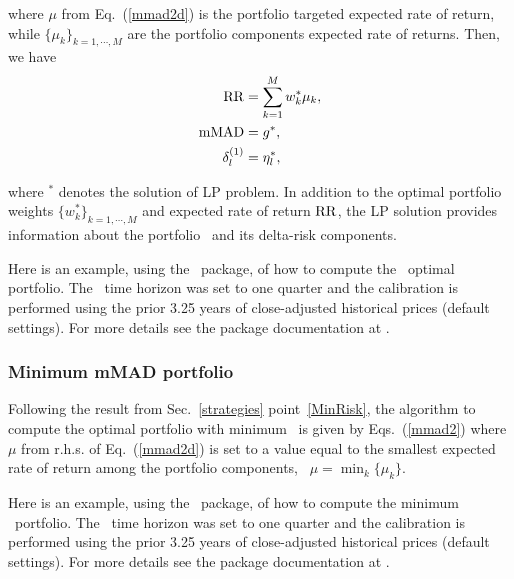 \noindent where $\mu$ from Eq.~(\ref{mmad2d}) is the portfolio targeted expected rate of return, while $\{\mu_k\}_{k = 1,\cdots,M}$
are the portfolio components expected rate of returns.
Then, we have
\begin{subequations}\label{mmad3}
\begin{align}
    \RR &= \sum_{k=1}^M w_k^* \mu_k, \label{mmad3a} \\
    \mMAD &= g^*, \label{mmad3b} \\
    \delta^{(1)}_l &= \eta_l^*, \label{mmad3c}
\end{align}
\end{subequations}

\noindent where $^*$ denotes the solution of LP problem.
In addition to the optimal portfolio weights $\{w_k^*\}_{k=1,\cdots,M}$ and
expected rate of return ${\rm RR}$, the
LP solution provides information about the portfolio \mMAD\ and its delta-risk components.

\bigskip
\noindent Here is an example, using the \azapy\ package, of how to compute the \mMAD\ optimal portfolio.
The \mMAD\ time horizon was set to one quarter and the calibration is performed using the prior 3.25 years of
close-adjusted historical prices (default settings).
For more details see the package documentation at \azapydoc.



\BackToContents

\subsubsection{Minimum mMAD portfolio}

Following the result from Sec.~\ref{strategies} point~\ref{MinRisk},
the algorithm to compute the optimal portfolio with minimum \mMAD\ is given by Eqs.~(\ref{mmad2}) where
$\mu$ from r.h.s. of Eq.~(\ref{mmad2d}) is set to a value equal to the smallest expected rate of
return among the portfolio components, \ie\ $\mu=\min_k\{\mu_k\}$.

\bigskip
\noindent Here is an example, using the \azapy\ package, of how to compute the minimum \mMAD\ portfolio.
The \mMAD\ time horizon was set to one quarter and the calibration is performed using the prior 3.25 years of
close-adjusted historical prices (default settings).
For more details see the package documentation at \azapydoc.



